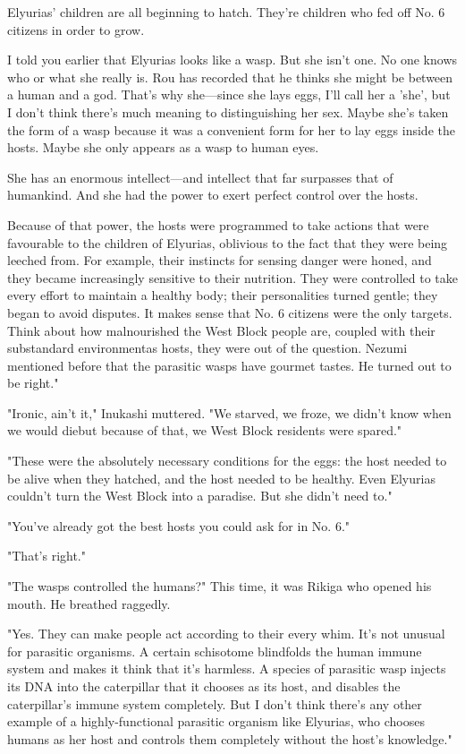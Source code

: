 Elyurias' children are all beginning to hatch. They're children who fed
off No. 6 citizens in order to grow.

I told you earlier that Elyurias looks like a wasp. But she isn't one.
No one knows who or what she really is. Rou has recorded that he thinks
she might be between a human and a god. That's why she---since she lays
eggs, I'll call her a 'she', but I don't think there's much meaning to
distinguishing her sex. Maybe she's taken the form of a wasp because it
was a convenient form for her to lay eggs inside the hosts. Maybe she
only appears as a wasp to human eyes.

She has an enormous intellect---and intellect that far surpasses that of
humankind. And she had the power to exert perfect control over the
hosts.

Because of that power, the hosts were programmed to take actions that
were favourable to the children of Elyurias, oblivious to the fact that
they were being leeched from. For example, their instincts for sensing
danger were honed, and they became increasingly sensitive to their
nutrition. They were controlled to take every effort to maintain a
healthy body; their personalities turned gentle; they began to avoid
disputes. It makes sense that No. 6 citizens were the only targets.
Think about how malnourished the West Block people are, coupled with
their substandard environment\el as hosts, they were out of the
question. Nezumi mentioned before that the parasitic wasps have gourmet
tastes. He turned out to be right."

"Ironic, ain't it," Inukashi muttered. "We starved, we froze, we didn't
know when we would die\el but because of that, we West Block residents
were spared."

"These were the absolutely necessary conditions for the eggs: the host
needed to be alive when they hatched, and the host needed to be healthy.
Even Elyurias couldn't turn the West Block into a paradise. But she
didn't need to."

"You've already got the best hosts you could ask for in No. 6."

"That's right."

"The wasps controlled the humans?" This time, it was Rikiga who opened
his mouth. He breathed raggedly.

"Yes. They can make people act according to their every whim. It's not
unusual for parasitic organisms. A certain schisotome blindfolds the
human immune system and makes it think that it's harmless. A species of
parasitic wasp injects its DNA into the caterpillar that it chooses as
its host, and disables the caterpillar's immune system completely. But I
don't think there's any other example of a highly-functional parasitic
organism like Elyurias, who chooses humans as her host and controls them
completely without the host's knowledge."

